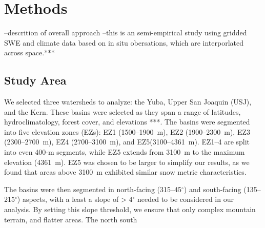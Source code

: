 




\hypertarget{ch2-sa}{\section{Methods}\label{ch2-sa}}

--descrition of overall approach
--this is an semi-empirical study using gridded SWE and climate data based on in situ obersations, which are interporlated across space.***

\hypertarget{ch2-sa}{\subsection{Study Area}\label{ch2-sa}}

We selected three watersheds to analyze: the Yuba, Upper San Joaquin (USJ), and the Kern. These basins were selected as they span a range of latitudes, hydroclimatology, forest cover, and elevations ***. The basins were segmented into five elevation zones (EZs): EZ1 (1500--1900~m), EZ2 (1900--2300~m), EZ3 (2300--2700~m), EZ4 (2700--3100~m), and EZ5(3100--4361~m). EZ1--4 are split into even 400-m segments, while EZ5 extends from 3100~m to the maximum elevation (4361~m). EZ5 was chosen to be larger to simplify our results, as we found that areas above 3100~m exhibited similar snow metric characteristics. 

The basins were then segmented in north-facing (315--45$^{\circ}$) and south-facing (135--215$^{\circ}$) aspects, with a least a slope of > 4$^{\circ}$ needed to be considered in our analysis. By setting this slope threshold, we ensure that only complex mountain terrain, and flatter areas. The north south 

